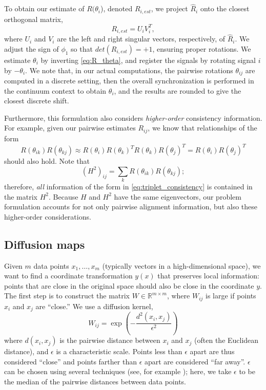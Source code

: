 \documentclass[12pt]{article}
\begin{document}
%
To obtain our estimate of $R(\theta_i$), denoted $R_{i, est}$, we project $\hat{R}_i$ onto the closest orthogonal matrix, 
\begin{equation} \label{eq:R_est}
R_{i, est} = U_i V_i^T,
\end{equation}
where $U_i$ and $V_i$ are the left and right singular vectors, respectively, of $\hat{R}_i$.
%
We adjust the sign of $\phi_1$ so that $det(R_{i, est}) = +1$, ensuring proper rotations.
%
We estimate $\theta_{i}$ by inverting \eqref{eq:R_theta}, and register the signals by rotating signal $i$ by $-\theta_i$.
%
We note that, in our actual computations, the pairwise rotations $\theta_{ij}$ are computed in a discrete setting, then the overall
synchronization is performed in the continuum context to obtain $\theta_i$, and the results are rounded to give the closest
discrete shift.

Furthermore, this formulation also considers {\it higher-order} consistency information.
%
For example, given our pairwise estimates $R_{ij}$, we know that relationships of the form
\begin{equation} \label{eq:triplet_consistency}
R(\theta_{ik}) R(\theta_{kj}) \approx R(\theta_i) R(\theta_k)^T R(\theta_k) R(\theta_j)^T = R(\theta_i) R(\theta_j)^T
\end{equation}
should also hold.
%
Note that
\begin{equation}
(H^2)_{ij} = \sum_k R(\theta_{ik}) R(\theta_{kj});
\end{equation}
therefore, {\it all} information of the form in \eqref{eq:triplet_consistency} is contained in the matrix $H^2$.
%
Because $H$ and $H^2$ have the same eigenvectors, our problem formulation accounts for not only pairwise alignment information, but also these higher-order considerations.

\subsection{Diffusion maps \cite{coifman2005geometric}}

Given $m$ data points $x_1, \dots, x_m$ (typically vectors in a high-dimensional space), we want to find a coordinate transformation $y(x)$ that preserves local information: points that are close in the original space should also be close in the coordinate $y$.
%
The first step is to construct the matrix $W \in \mathbb{R}^{m \times m}$, where $W_{ij}$ is large if points $x_i$ and $x_j$ are ``close.''
%
We use a diffusion kernel,
\begin{equation} \label{eq:dmaps_W}
W_{ij} = \exp \left( -\frac{d^2(x_i, x_j)}{\epsilon^2} \right)
\end{equation}
where $d(x_i, x_j)$ is the pairwise distance between $x_i$ and $x_j$ (often the Euclidean distance), and $\epsilon$ is a characteristic scale.
%
Points less than $\epsilon$ apart are thus considered ``close'' and points farther than $\epsilon$ apart are considered ``far away''.
%
$\epsilon$ can be chosen using several techniques (see, for example \cite{coifman2008graph}); here, we take $\epsilon$ to be the median of the pairwise distances between data points.
\end{document}

